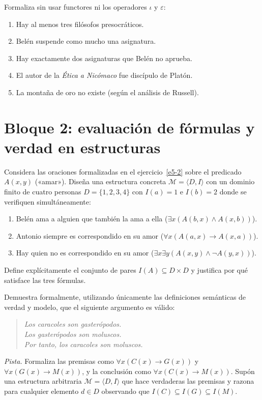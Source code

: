 \begin{pregunta}\label{e5-cant}
Formaliza sin usar functores ni los operadores $\iota$ y $\varepsilon$:
\begin{enumerate}
    \item Hay al menos tres filósofos presocráticos.
    \item Belén suspende como mucho una asignatura.
    \item Hay exactamente dos asignaturas que Belén no aprueba.
    \item El autor de la \emph{Ética a Nicómaco} fue discípulo de Platón.
    \item La montaña de oro no existe (según el análisis de Russell).
\end{enumerate}
\end{pregunta}

\section*{Bloque 2: evaluación de fórmulas y verdad en estructuras}

\begin{pregunta}\label{e5-4}
Considera las oraciones formalizadas en el ejercicio~\ref{e5-2} sobre el predicado $A(x, y)$ («amar»). Diseña una estructura concreta $\mathcal{M} = \langle D, I \rangle$ con un dominio finito de cuatro personas $D = \{1, 2, 3, 4\}$ con $I(a) = 1$ e $I(b) = 2$ donde se verifiquen simultáneamente:
\begin{enumerate}
    \item Belén ama a alguien que también la ama a ella ($\exists x (A(b, x) \land A(x, b))$).
    \item Antonio siempre es correspondido en su amor ($\forall x (A(a, x) \to A(x, a))$).
    \item Hay quien no es correspondido en su amor ($\exists x \exists y (A(x, y) \land \neg A(y, x))$).
\end{enumerate}
Define explícitamente el conjunto de pares $I(A) \subseteq D \times D$ y justifica por qué satisface las tres fórmulas.
\end{pregunta}

\begin{pregunta}\label{e5-5}
Demuestra formalmente, utilizando únicamente las definiciones semánticas de verdad y modelo, que el siguiente argumento es válido:
\begin{quote}
\textit{Los caracoles son gasterópodos.}\\
\textit{Los gasterópodos son moluscos.}\\
\textit{Por tanto, los caracoles son moluscos.}
\end{quote}
\textit{Pista.} Formaliza las premisas como $\forall x (C(x) \to
G(x))$ y $\forall x (G(x) \to M(x))$, y la conclusión como $\forall x
(C(x) \to M(x))$. Supón una estructura arbitraria $\mathcal{M} =
\langle D, I \rangle$ que hace verdaderas las premisas y razona para
cualquier elemento $d \in D$ observando que $I(C) \subseteq I(G)
\subseteq I(M)$. 
\end{pregunta}

